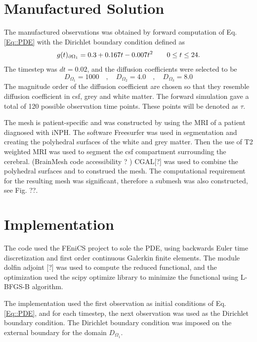 \documentclass[11pt,a4paper]{article}
\begin{document}
\section*{Manufactured Solution}
The manufactured observations was obtained by forward computation of Eq.\ref{Eq::PDE} with the Dirichlet boundary condition defined as
\begin{equation}
g(t)_{\partial \Omega_1} = 0.3 +0.167t - 0.007t\sp{2} \qquad  0 \leq t \leq 24.
\end{equation}
The timestep was $dt = 0.02$, and the diffusion coefficients were selected to be 
\begin{equation}
D_{\Omega_1} = 1000 \quad , \quad D_{\Omega_2} = 4.0 \quad , \quad D_{\Omega_3} = 8.0 
\end{equation}  
The magnitude order of the diffusion coefficient are chosen so that they resemble diffusion coefficient in csf, grey and white matter. The forward simulation gave a total of 120 possible observation time points. These points 
will be denoted as $\tau$.

The mesh is patient-specific and was constructed by using the MRI of a patient diagnosed with iNPH. The software Freesurfer was used in segmentation and creating the polyhedral surfaces of the white and grey matter. Then the use of T2 weighted MRI was used to segment the csf compartment surrounding the cerebral. (BrainMesh code accessibility ? ) CGAL[?] was used to combine the polyhedral surfaces and to construed the mesh. The computational requirement for the resulting mesh was significant, therefore a submesh was also constructed, see Fig. ??. 


\section*{Implementation}
The code used the FEniCS project to sole the PDE, using backwards Euler time discretization and first order continuous Galerkin finite elements. The module dolfin adjoint [?] was used to compute the reduced functional, and the optimization used the scipy optimize library to minimize the functional using L-BFGS-B algorithm.   

The implementation used the first observation as initial conditions of Eq.\ref{Eq::PDE}, and for each timestep, the next observation was used as the Dirichlet boundary condition. The Dirichlet boundary condition was imposed on the external boundary for the domain $D_{\Omega_1}$. 
\end{document}
